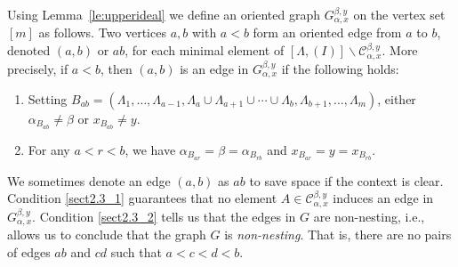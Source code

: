 Using Lemma~\ref{le:upperideal} we define an oriented graph $G_{\alpha,x}^{\beta,y}$ on the vertex set $[m]$ as follows. Two vertices $a,b$ with $a<b$ form an oriented edge from $a$ to $b$, denoted $(a,b)$ or $ab$, for each minimal element of $[\Lambda,(I)]\backslash \mathcal{C}_{\alpha,x}^{\beta,y}$. 
More precisely, if $a<b$, then $(a,b)$ is an edge in $ G_{\alpha,x}^{\beta,y}$ if the following holds:
\begin{enumerate}
 \item %
\label{sect2.3_1} Setting $B_{ab}=(\Lambda_1,\ldots,\Lambda_{a-1},\Lambda_a\cup\Lambda_{a+1}\cup {}\cdots{}\cup \Lambda_b,\Lambda_{b+1},\ldots,\Lambda_m)$, either
 $ \alpha_{B_{ab}}\ne \beta$ or $x_{B_{ab}}\ne y.$
 \item %
\label{sect2.3_2}For any $a<r<b$, we have $ \alpha_{B_{ar}}= \beta=\alpha_{B_{rb}}$ and $x_{B_{ar}}= y=x_{B_{rb}}.$
\end{enumerate}
We sometimes denote an edge $(a,b)$ as $ab$ to save space if the context is clear.
Condition \eqref{sect2.3_1} guarantees that no element $A\in\mathcal{C}_{\alpha,x}^{\beta,y}$ induces an edge in $G_{\alpha,x}^{\beta,y}$. Condition \eqref{sect2.3_2} tells us that the edges in $G$ are non-nesting, i.e., 
allows us to conclude that the graph $G$ is \emph{non-nesting}. That is, there are no pairs of edges $ab$ and $cd$ such that $a<c<d< b$. 

